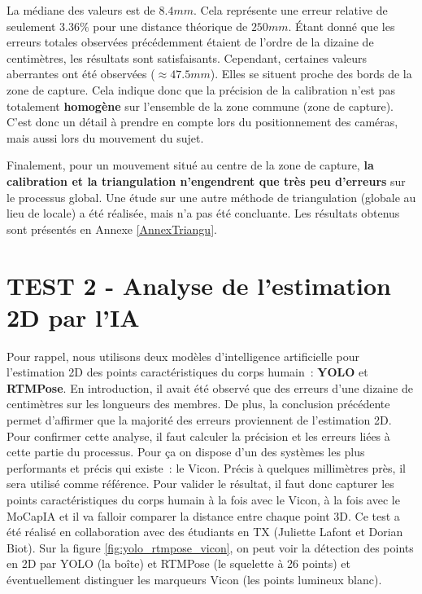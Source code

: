         La médiane des valeurs est de $8.4mm$. Cela représente une erreur relative de seulement $3.36\%$ pour une distance théorique de $250mm$. Étant donné que les erreurs totales observées précédemment étaient de l'ordre de la dizaine de centimètres, les résultats sont satisfaisants. 
        Cependant, certaines valeurs aberrantes ont été observées ($\approx 47.5mm$). Elles se situent proche des bords de la zone de capture. Cela indique donc que la précision de la calibration n'est pas totalement \textbf{homogène} sur l'ensemble de la zone commune (zone de capture). C'est donc un détail à prendre en compte lors du positionnement des caméras, mais aussi lors du mouvement du sujet.
        
        Finalement, pour un mouvement situé au centre de la zone de capture, \textbf{la calibration et la triangulation n'engendrent que très peu d'erreurs} sur le processus global. Une étude sur une autre méthode de triangulation (globale au lieu de locale) a été réalisée, mais n'a pas été concluante. Les résultats obtenus sont présentés en Annexe \ref{AnnexTriangu}.


\section{TEST 2 - Analyse de l'estimation 2D par l'IA}
\label{estimation2D}
    Pour rappel, nous utilisons deux modèles d'intelligence artificielle pour l'estimation 2D des points caractéristiques du corps humain : \textbf{YOLO} et \textbf{RTMPose}.
    En introduction, il avait été observé que des erreurs d'une dizaine de centimètres sur les longueurs des membres. De plus, la conclusion précédente permet d'affirmer que la majorité des erreurs proviennent de l'estimation 2D. Pour confirmer cette analyse, il faut calculer la précision et les erreurs liées à cette partie du processus. Pour ça on dispose d'un des systèmes les plus performants et précis qui existe : le Vicon. Précis à quelques millimètres près, il sera utilisé comme référence. Pour valider le résultat, il faut donc capturer les points caractéristiques du corps humain à la fois avec le Vicon, à la fois avec le MoCapIA et il va falloir comparer la distance entre chaque point 3D.
    Ce test a été réalisé en collaboration avec des étudiants en TX (Juliette Lafont et Dorian Biot). Sur la figure \ref{fig:yolo_rtmpose_vicon}, on peut voir la détection des points en 2D par YOLO (la boîte) et RTMPose (le squelette à 26 points) et éventuellement distinguer les marqueurs Vicon (les points lumineux blanc).

